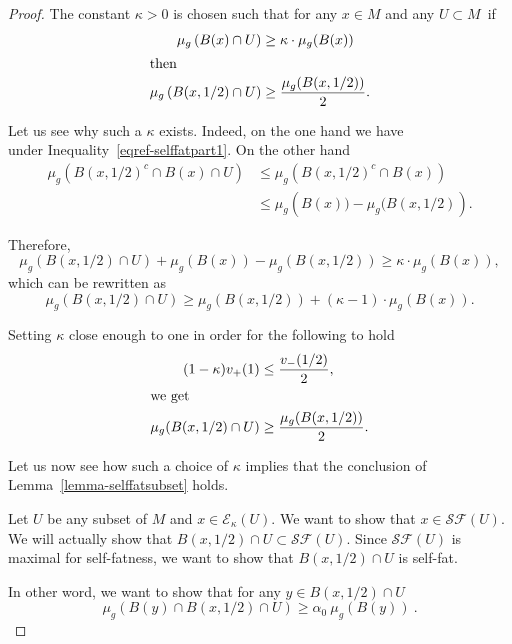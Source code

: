 \documentclass[AHL,Unicode,longabstracts,published]{cedram}
\newcommand{\cE}{\mathcal{E}}
\newcommand{\cSF}{\mathcal{SF}}
\begin{document}
\begin{proof} 
The constant $\kappa > 0$ is chosen such that for any $x \in M$ and any $U \subset M$~if
\begin{align}
\mu_g\left(B(x) \cap U\right) &\ge \kappa \cdot \mu_g(B(x))
\label{eqref-selffatpart1}\\
\intertext{then}
\mu_g\left(B(x, 1/2) \cap U\right) &\ge \frac{\mu_g(B(x, 1/2))}{2} .\label{eqref-selffatpart2}
\end{align}

Let us see why such a $\kappa$ exists. Indeed, on the one hand we have
\[
\]
under Inequality~\eqref{eqref-selffatpart1}. On the other hand
\begin{align*}
\mu_g\left(B(x, 1/2)^c \cap B(x) \cap U\right) & \le \mu_g\left(B(x, 1/2)^c \cap B(x)\right) \\
& \le \mu_g\left(B(x)) - \mu_g(B(x,1/2)\right) .
\end{align*}

Therefore,
\[
\mu_g(B(x, 1/2) \cap U) + \mu_g(B(x)) - \mu_g(B(x,1/2)) \ge \kappa \cdot \mu_g(B(x)) ,
\]
which can be rewritten as
\[
\mu_g(B(x, 1/2) \cap U) \ge \mu_g(B(x,1/2)) + (\kappa -1) \cdot \mu_g(B(x)).
\]

Setting $\kappa$ close enough to one in order for the following to hold
\begin{align*}
(1- \kappa) v_+(1) &\le \frac{v_-(1/2)}{2},
\\
\intertext{we get}
\mu_g(B(x, 1/2) \cap U) &\ge \frac{\mu_g(B(x,1/2))}{2} .
\end{align*}

Let us now see how such a choice of $\kappa$ implies that the conclusion of Lemma~\ref{lemma-selffatsubset} holds. 

Let $U$ be any subset of $M$ and $x \in \cE_{\kappa}(U)$. We want to show that $x \in \cSF(U)$. We will actually show that $B(x, 1/2) \cap U \subset \cSF(U)$. Since $\cSF(U)$ is maximal for self-fatness, we want to show that $B(x, 1/2) \cap U$ is self-fat. 

In other word, we want to show that for any $y \in B(x, 1/2) \cap U$
\[
\mu_g\left(B(y) \cap B(x, 1/2) \cap U\right) \ge \alpha_0 \ \mu_g(B(y)) \ .
\]


\end{proof}
\end{document}
